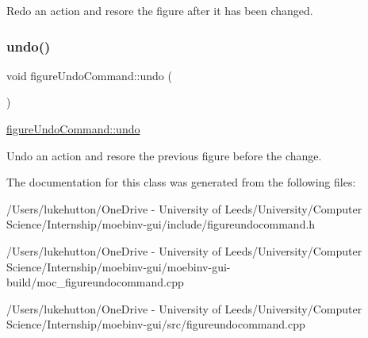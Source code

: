 Redo an action and resore the figure after it has been changed. \mbox{\label{classfigure_undo_command_a9e733f81f847b07673f141bf13c5aace}} 
\subsubsection{\texorpdfstring{undo()}{undo()}}
{\footnotesize\ttfamily void figure\+Undo\+Command\+::undo (\begin{DoxyParamCaption}{ }\end{DoxyParamCaption})}



\mbox{\hyperlink{classfigure_undo_command_a9e733f81f847b07673f141bf13c5aace}{figure\+Undo\+Command\+::undo}} 

Undo an action and resore the previous figure before the change. 

The documentation for this class was generated from the following files\+:\begin{DoxyCompactItemize}
\item 
/\+Users/lukehutton/\+One\+Drive -\/ University of Leeds/\+University/\+Computer Science/\+Internship/moebinv-\/gui/include/figureundocommand.\+h\item 
/\+Users/lukehutton/\+One\+Drive -\/ University of Leeds/\+University/\+Computer Science/\+Internship/moebinv-\/gui/moebinv-\/gui-\/build/moc\+\_\+figureundocommand.\+cpp\item 
/\+Users/lukehutton/\+One\+Drive -\/ University of Leeds/\+University/\+Computer Science/\+Internship/moebinv-\/gui/src/figureundocommand.\+cpp\end{DoxyCompactItemize}
